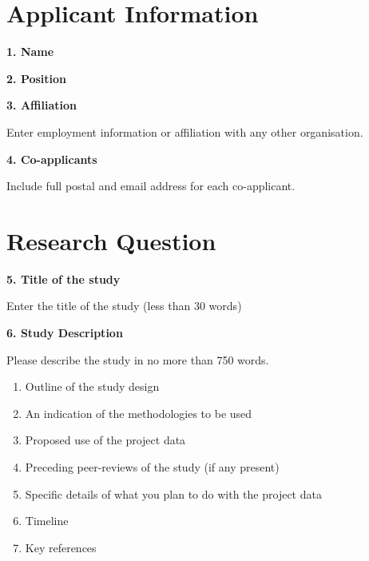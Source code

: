 \documentclass[a4paper,12pt]{article}
\begin{document}
\begin{Form}

\section*{Applicant Information}

\textbf{1. Name}

\TextField[name=applicantName]{}

\textbf{2. Position}

\TextField[name=applicantPosition]{}

\textbf{3. Affiliation}

Enter employment information or affiliation with any other organisation.

\TextField[name=applicantAffiliation,multiline=true]{}

\textbf{4. Co-applicants}

Include full postal and email address for each co-applicant.

\TextField[name=coapplicants,multiline=true,height=14\baselineskip]{}

\newpage

\section*{Research Question}

\textbf{5. Title of the study}

Enter the title of the study (less than 30 words)

\TextField[name=studyTitle,multiline=true,height=3\baselineskip]{}

\textbf{6. Study Description}

Please describe the study in no more than 750 words.

\begin{enumerate}
  \item Outline of the study design
  \item An indication of the methodologies to be used
  \item Proposed use of the project data
  \item Preceding peer-reviews of the study (if any present)
  \item Specific details of what you plan to do with the project data
  \item Timeline
  \item Key references
\end{enumerate}


\end{Form}
\end{document}

